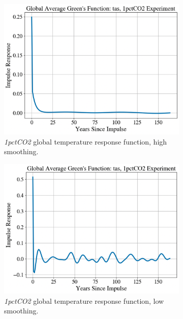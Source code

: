 \begin{figure}[ht]
  \begin{subfigure}{0.45\textwidth}
    \includegraphics[width=\linewidth]{Figures/tas_1.png}
    \caption{\textit{1pctCO2} global temperature response function, high smoothing.} \label{fig:a}
  \end{subfigure}\hspace*{\fill}
  \begin{subfigure}{0.45\textwidth}
    \includegraphics[width=\linewidth]{Figures/tas_2.png}
    \caption{\textit{1pctCO2} global temperature response function, low smoothing.} \label{fig:b}
  \end{subfigure}
  \medskip
  \begin{subfigure}{0.45\textwidth}

\end{subfigure}
\end{figure}
